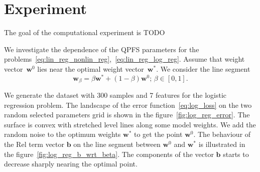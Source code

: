 \documentclass[a4paper,12pt]{article}
\theoremstyle{plain} %
\theoremstyle{definition} %
\theoremstyle{remark} %
\newcommand{\bb}{\mathbf{b}}
\newcommand{\bw}{\mathbf{w}}
\begin{document}
  	\section*{Experiment}
  	The goal of the computational experiment is {\color{red} TODO}
  	
  	We investigate the dependence of the QPFS parameters for the problems~\eqref{eq:lin_reg_nonlin_reg},~\eqref{eq:lin_reg_log_reg}. 
  	Assume that weight vector~$\bw^0$ lies near the optimal weight vector~$\bw^*$. 
  	We consider the line segment
  	\[
  	\bw_{\beta} = \beta \bw^* + (1 - \beta) \bw^0; \, \beta \in [0, 1] .
  	\]
  	
  	We generate the dataset with 300 samples and 7 features for the logistic regression problem. 
  	The landscape of the error function~\eqref{eq:log_loss} on the two random selected parameters grid is shown in the figure~\ref{fig:log_reg_error}.
  	The surface is convex with stretched level lines along some model weights.
  	We add the random noise to the optimum weights $\bw^*$ to get the point $\bw^0$. The behaviour of the Rel term vector $\bb$ on the line segment between $\bw^0$ and $\bw^*$ is illustrated in the figure~\ref{fig:log_reg_b_wrt_beta}.
  	The components of the vector $\bb$ starts to decrease sharply nearing the optimal point.
\end{document}
